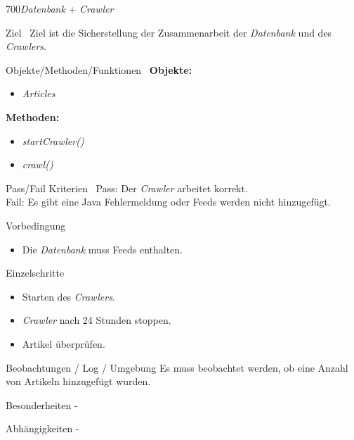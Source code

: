 \pagebreak[2]

\begin{testcase}{700}{\textit{Datenbank} + \textit{Crawler}}

\item[Ziel]\
Ziel ist die Sicherstellung der Zusammenarbeit der \textit{Datenbank} und des \textit{Crawlers}.
\item[Objekte/Methoden/Funktionen]\
\textbf{Objekte: }
\begin{itemize}
\item \textit{Articles}
\end{itemize}

\textbf{Methoden: }
\begin{itemize}
\item \textit{startCrawler()}
\item \textit{crawl()}
\end{itemize}

\item[Pass/Fail Kriterien]\
Pass: Der \textit{Crawler} arbeitet korrekt.\\
Fail: Es gibt eine Java Fehlermeldung oder Feeds werden nicht hinzugefügt.

\item[Vorbedingung]
\begin{itemize} 
\item Die \textit{Datenbank} muss Feeds enthalten.
\end{itemize}
\item[Einzelschritte]
\begin{itemize}
\item Starten des \textit{Crawlers}.
\item \textit{Crawler} nach 24 Stunden stoppen.
\item Artikel überprüfen.
\end{itemize} 
\item[Beobachtungen / Log / Umgebung]
Es muss beobachtet werden, ob eine Anzahl von Artikeln hinzugefügt wurden.
\item[Besonderheiten] -
\item[Abhängigkeiten] -

\end{testcase}

\pagebreak[2]

